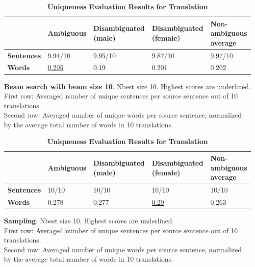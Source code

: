 \begin{table}[!htb]

    \begin{subtable}{\textwidth}
        \centering
        \begin{tabularx}{\linewidth}{|X|XXXX|}
            \hline
             & \textbf{Ambiguous} & \textbf{Disambiguated (male)} & \textbf{Disambiguated (female)} & \textbf{Non-ambiguous average} \\ \hline
             \textbf{Sentences} & 9.94/10 & 9.95/10 & 9.87/10 & \underline{9.97/10} \\ 
             \textbf{Words} & \underline{0.205} & 0.19 & 0.201 & 0.202 \\ \hline
        \end{tabularx}
        \caption{\textbf{Beam search with beam size 10}. Nbest size 10. Highest scores are underlined. \\ First row: Averaged number of unique sentences per source sentence out of 10 translations. \\ Second row: Averaged number of unique words per source sentence, normalized by the average total number of words in 10 translations.}
        \label{tab:uniqueness_translation_10}
    \end{subtable}

    \begin{subtable}{\textwidth}
        \centering
        \begin{tabularx}{\linewidth}{|X|XXXX|}
            \hline
             & \textbf{Ambiguous} & \textbf{Disambiguated (male)} & \textbf{Disambiguated (female)} & \textbf{Non-ambiguous average} \\ \hline
             \textbf{Sentences} & 10/10 & 10/10 & 10/10 & 10/10 \\ 
             \textbf{Words} & 0.278 & 0.277 & \underline{0.29} & 0.263 \\ \hline
        \end{tabularx}
        \caption{\textbf{Sampling}. Nbest size 10. Highest scores are underlined. \\ First row: Averaged number of unique sentences per source sentence out of 10 translations. \\ Second row: Averaged number of unique words per source sentence, normalized by the average total number of words in 10 translations.}
        \label{tab:uniqueness_translation_sampling}
    \end{subtable}
    \caption{\textbf{Uniqueness Evaluation Results for Translation}}
    \label{tab:uniqueness_translation}
\end{table}


